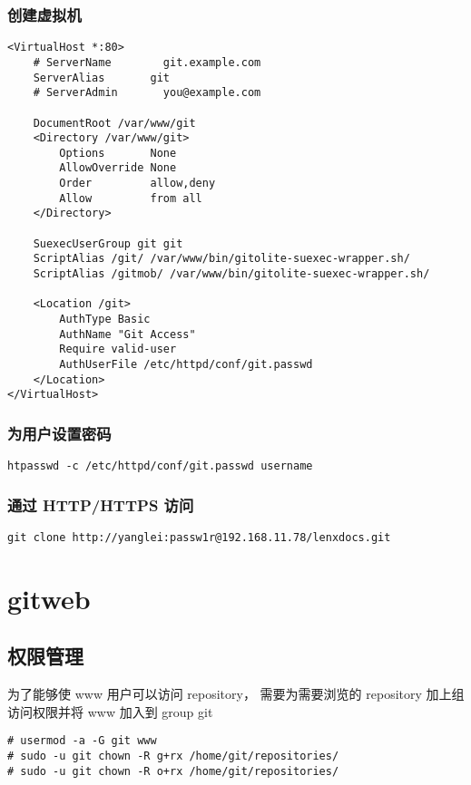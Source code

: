 \documentclass[a4paper,11pt,twoside,openany]{article}
\begin{document}
\subsubsection{创建虚拟机}

\begin{lstlisting}
<VirtualHost *:80>
    # ServerName        git.example.com
    ServerAlias       git
    # ServerAdmin       you@example.com

    DocumentRoot /var/www/git
    <Directory /var/www/git>
        Options       None
        AllowOverride None
        Order         allow,deny
        Allow         from all
    </Directory>

    SuexecUserGroup git git
    ScriptAlias /git/ /var/www/bin/gitolite-suexec-wrapper.sh/
    ScriptAlias /gitmob/ /var/www/bin/gitolite-suexec-wrapper.sh/

    <Location /git>
        AuthType Basic
        AuthName "Git Access"
        Require valid-user
        AuthUserFile /etc/httpd/conf/git.passwd
    </Location>
</VirtualHost>

\end{lstlisting}

\subsubsection{为用户设置密码}
\begin{lstlisting}
htpasswd -c /etc/httpd/conf/git.passwd username
\end{lstlisting}

\subsubsection{通过 HTTP/HTTPS 访问}
\begin{lstlisting}
git clone http://yanglei:passw1r@192.168.11.78/lenxdocs.git
\end{lstlisting}

\section{gitweb}
\subsection{权限管理}
为了能够使 www 用户可以访问 repository， 需要为需要浏览的 repository 加上组访问权限并将 www 加入到 group git

\begin{lstlisting}
# usermod -a -G git www
# sudo -u git chown -R g+rx /home/git/repositories/
# sudo -u git chown -R o+rx /home/git/repositories/
\end{lstlisting}
\end{document}
